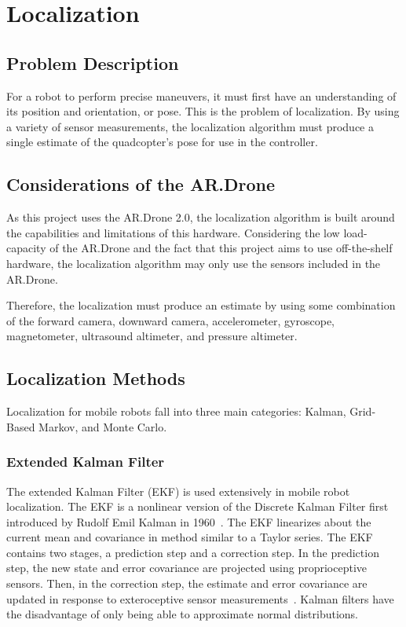 
\chapter{Localization\label{ch:localization}}

\section{Problem Description}
	For a robot to perform precise maneuvers, it must first have an understanding of its position and orientation, or pose. This is the problem of localization. By using a variety of sensor measurements, the localization algorithm must produce a single estimate of the quadcopter's pose for use in the controller.

\section{Considerations of the AR.Drone}

	As this project uses the AR.Drone 2.0, the localization algorithm is built around the capabilities and limitations of this hardware. Considering the low load-capacity of the AR.Drone and the fact that this project aims to use off-the-shelf hardware, the localization algorithm may only use the sensors included in the AR.Drone.

	Therefore, the localization must produce an estimate by using some combination of the forward camera, downward camera, accelerometer, gyroscope, magnetometer, ultrasound altimeter, and pressure altimeter. 

\section{Localization Methods}

	Localization for mobile robots fall into three main categories: Kalman, Grid-Based Markov, and Monte Carlo.

	\subsection{Extended Kalman Filter}
	The extended Kalman Filter (EKF) is used extensively in mobile robot localization. The EKF is a nonlinear version of the Discrete Kalman Filter first introduced by Rudolf Emil Kalman in 1960~\cite{Kalman}. The EKF linearizes about the current mean and covariance in  method similar to a Taylor series. The EKF contains two stages, a prediction step and a correction step. In the prediction step, the new state and error covariance are projected using proprioceptive sensors. Then, in the correction step, the estimate and error covariance are updated in response to exteroceptive sensor measurements~\cite{Welch}. Kalman filters have the disadvantage of only being able to approximate normal distributions.

